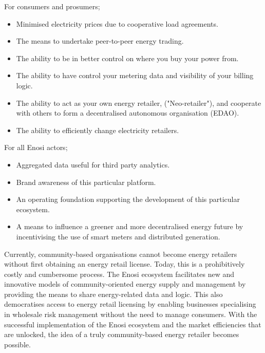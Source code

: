 \documentclass[a4paper,12pt,reqno]{amsart}
\theoremstyle{definition}
\begin{document}
\noindent For consumers and prosumers;
\begin{itemize}
\item{Minimised electricity prices due to cooperative load agreements.}
\item{The means to undertake peer-to-peer energy trading.}
\item{The ability to be in better control on where you buy your power from.}
\item{The ability to have control your metering data and visibility of your billing logic.}
\item{The ability to act as your own energy retailer, ("Neo-retailer"), and cooperate with others to form a decentralised autonomous organisation (EDAO).}
\item{The ability to efficiently change electricity retailers.\\}
\end{itemize}

\noindent For all Enosi actors;
\begin{itemize}
\item{Aggregated data useful for third party analytics.}
\item{Brand awareness of this particular platform.}
\item{An operating foundation supporting the development of this particular ecosystem.}
\item{A means to influence a greener and more decentralised energy future by incentivising the use of smart meters and distributed generation.}
\end{itemize}

Currently, community-based organisations cannot become energy retailers without first obtaining an energy retail license. Today, this is a prohibitively costly and cumbersome process. The Enosi ecosystem facilitates new and innovative models of community-oriented energy supply and management by providing the means to share energy-related data and logic. This also democratises access to energy retail licensing by enabling businesses specialising in wholesale risk management without the need to manage consumers. With the successful implementation of the Enosi ecosystem and the market efficiencies that are unlocked, the idea of a truly community-based energy retailer becomes possible.
\end{document}
